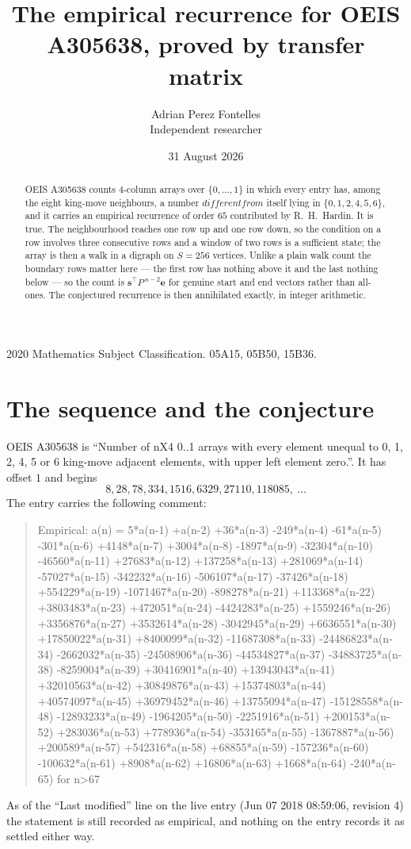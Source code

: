 \documentclass[11pt,a4paper]{article}
\title{The empirical recurrence for OEIS A305638, proved by transfer matrix}
\author{Adrian Perez Fontelles\\ \small Independent researcher}
\date{31 August 2026}
\theoremstyle{plain}
\theoremstyle{definition}
\begin{document}
\maketitle

\begin{abstract}
OEIS A305638 counts $4$-column arrays over $\{0,\dots,1\}$ in which every entry has,
among the eight king-move neighbours, a number $different from$ itself lying in $\{0,1,2,4,5,6\}$, and it carries an empirical
recurrence of order $65$ contributed by R.~H.~Hardin. It is true. The neighbourhood
reaches one row up and one row down, so the condition on a row involves three consecutive
rows and a window of two rows is a sufficient state; the array is then a walk in a digraph
on $S=256$ vertices. Unlike a plain walk count the boundary rows matter here --- the first
row has nothing above it and the last nothing below --- so the count is
$\mathbf{s}^{\!\top}P^{\,n-2}\mathbf{e}$ for genuine start and end vectors rather than
all-ones. The conjectured recurrence is then annihilated exactly, in integer arithmetic.
\end{abstract}

\noindent\small 2020 Mathematics Subject Classification. 05A15, 05B50, 15B36.\normalsize

\section{The sequence and the conjecture}

OEIS A305638 is ``Number of nX4 0..1 arrays with every element unequal to 0, 1, 2, 4, 5 or 6 king-move adjacent elements, with upper left element zero.''. It has offset
$1$ and begins
\[
8, 28, 78, 334, 1516, 6329, 27110, 118085,\ \dots
\]
The entry carries the following comment:
\begin{quote}\small
Empirical: a(n) = 5*a(n-1) +a(n-2) +36*a(n-3) -249*a(n-4) -61*a(n-5) -301*a(n-6) +4148*a(n-7) +3004*a(n-8) -1897*a(n-9) -32304*a(n-10) -46560*a(n-11) +27683*a(n-12) +137258*a(n-13) +281069*a(n-14) -57027*a(n-15) -342232*a(n-16) -506107*a(n-17) -37426*a(n-18) +554229*a(n-19) -1071467*a(n-20) -898278*a(n-21) +113368*a(n-22) +3803483*a(n-23) +472051*a(n-24) -4424283*a(n-25) +1559246*a(n-26) +3356876*a(n-27) +3532614*a(n-28) -3042945*a(n-29) +6636551*a(n-30) +17850022*a(n-31) +8400099*a(n-32) -11687308*a(n-33) -24486823*a(n-34) -2662032*a(n-35) -24508906*a(n-36) -44534827*a(n-37) -34883725*a(n-38) -8259004*a(n-39) +30416901*a(n-40) +13943043*a(n-41) +32010563*a(n-42) +30849876*a(n-43) +15374803*a(n-44) +40574097*a(n-45) +36979452*a(n-46) +13755094*a(n-47) -15128558*a(n-48) -12893233*a(n-49) -1964205*a(n-50) -2251916*a(n-51) +200153*a(n-52) +283036*a(n-53) +778936*a(n-54) -353165*a(n-55) -1367887*a(n-56) +200589*a(n-57) +542316*a(n-58) +68855*a(n-59) -157236*a(n-60) -100632*a(n-61) +8908*a(n-62) +16806*a(n-63) +1668*a(n-64) -240*a(n-65) for n>67
\end{quote}
As of the ``Last modified'' line on the live entry (Jun 07 2018 08:59:06, revision
4) the statement is still recorded as empirical, and nothing on the entry
records it as settled either way.
\end{document}
